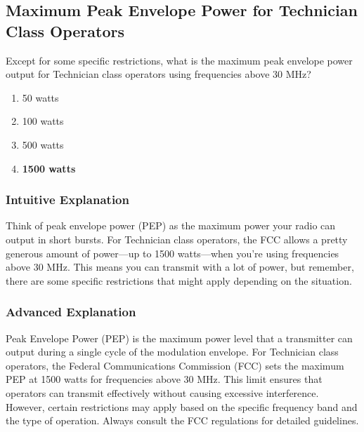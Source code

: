 \subsection{Maximum Peak Envelope Power for Technician Class Operators}
\label{T1B12}

\begin{tcolorbox}[colback=gray!10!white,colframe=black!75!black,title=T1B12]
Except for some specific restrictions, what is the maximum peak envelope power output for Technician class operators using frequencies above 30 MHz?
\begin{enumerate}[label=\Alph*,noitemsep]
    \item 50 watts
    \item 100 watts
    \item 500 watts
    \item \textbf{1500 watts}
\end{enumerate}
\end{tcolorbox}

\subsubsection*{Intuitive Explanation}
Think of peak envelope power (PEP) as the maximum power your radio can output in short bursts. For Technician class operators, the FCC allows a pretty generous amount of power—up to 1500 watts—when you're using frequencies above 30 MHz. This means you can transmit with a lot of power, but remember, there are some specific restrictions that might apply depending on the situation.

\subsubsection*{Advanced Explanation}
Peak Envelope Power (PEP) is the maximum power level that a transmitter can output during a single cycle of the modulation envelope. For Technician class operators, the Federal Communications Commission (FCC) sets the maximum PEP at 1500 watts for frequencies above 30 MHz. This limit ensures that operators can transmit effectively without causing excessive interference. However, certain restrictions may apply based on the specific frequency band and the type of operation. Always consult the FCC regulations for detailed guidelines.